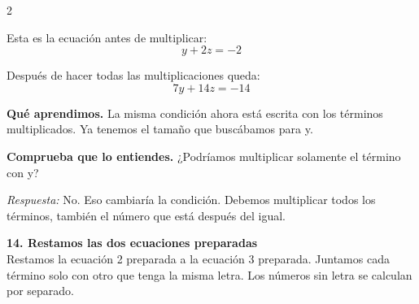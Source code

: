 \documentclass[11pt,a4paper,landscape]{article}
\begin{document}
\begin{multicols*}{2}
\begin{minipage}{\linewidth}
\par\smallskip Esta es la ecuación antes de multiplicar:
\[y + 2z = -2\]
\par{}\par\smallskip
\par\smallskip Después de hacer todas las multiplicaciones queda:
\[7y + 14z = -14\]
\par\smallskip\textbf{Qué aprendimos.} La misma condición ahora está escrita con los términos multiplicados. Ya tenemos el tamaño que buscábamos para y.
\par\smallskip\textbf{Comprueba que lo entiendes.} ¿Podríamos multiplicar solamente el término con y?\par\textit{Respuesta:} No. Eso cambiaría la condición. Debemos multiplicar todos los términos, también el número que está después del igual.
\end{minipage}\par\medskip
\noindent\begin{minipage}{\linewidth}\textbf{14. Restamos las dos ecuaciones preparadas}\\[2pt]Restamos la ecuación 2 preparada a la ecuación 3 preparada. Juntamos cada término solo con otro que tenga la misma letra. Los números sin letra se calculan por separado.
\par{}\par\smallskip

\end{minipage}
\end{multicols*}
\end{document}

